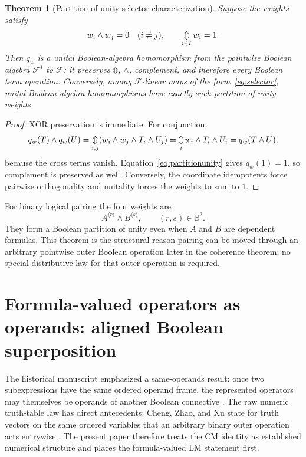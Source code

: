 \documentclass[11pt]{article}
\newtheorem{theorem}{Theorem}[section]
\theoremstyle{definition}
\theoremstyle{remark}
\newcommand{\B}{\mathbb B}
\newcommand{\cF}{\mathcal F}
\newcommand{\xor}{\mathbin{\Updownarrow}}
\newcommand{\bigxor}{\mathop{\Updownarrow}\displaylimits}
\begin{document}
\begin{theorem}[Partition-of-unity selector characterization]
Suppose the weights satisfy
\begin{equation}
 w_i\land w_j=0\quad(i\ne j),
 \qquad
 \bigxor_{i\in I}w_i=1.
 \label{eq:partitionunity}
\end{equation}
Then $q_w$ is a unital Boolean-algebra homomorphism from the pointwise Boolean algebra $\cF^I$ to $\cF$: it preserves $\xor$, $\land$, complement, and therefore every Boolean term operation.  Conversely, among $\cF$-linear maps of the form~\eqref{eq:selector}, unital Boolean-algebra homomorphisms have exactly such partition-of-unity weights.
\end{theorem}
\begin{proof}
XOR preservation is immediate.  For conjunction,
\[
 q_w(T)\land q_w(U)
 =\bigxor_{i,j}(w_i\land w_j\land T_i\land U_j)
 =\bigxor_i w_i\land T_i\land U_i
 =q_w(T\land U),
\]
because the cross terms vanish.  Equation~\eqref{eq:partitionunity} gives $q_w(1)=1$, so complement is preserved as well.  Conversely, the coordinate idempotents force pairwise orthogonality and unitality forces the weights to sum to $1$.
\end{proof}

For binary logical pairing the four weights are
\[
 A^{\langle r\rangle}\land B^{\langle s\rangle},
 \qquad (r,s)\in\B^2.
\]
They form a Boolean partition of unity even when $A$ and $B$ are dependent formulas.  This theorem is the structural reason pairing can be moved through an arbitrary pointwise outer Boolean operation later in the coherence theorem; no special distributive law for that outer operation is required.

\section{Formula-valued operators as operands: aligned Boolean superposition}
\label{sec:operatoronoperator}

The historical manuscript emphasized a same-operands result: once two subexpressions have the same ordered operand frame, the represented operators may themselves be operands of another Boolean connective \cite{Droncheff2018}.  The raw numeric truth-table law has direct antecedents: Cheng, Zhao, and Xu state for truth vectors on the same ordered variables that an arbitrary binary outer operation acts entrywise \cite[Prop.~3.3]{Cheng2011}.  The present paper therefore treats the CM identity as established numerical structure and places the formula-valued LM statement first.
\end{document}
